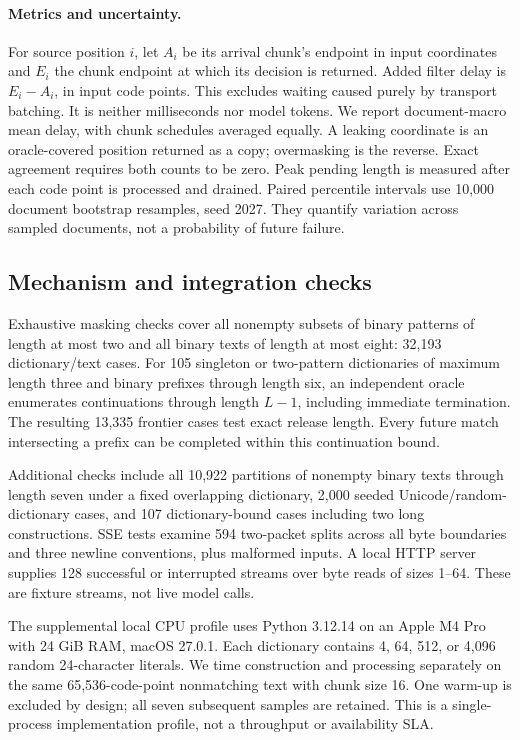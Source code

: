 \documentclass[11pt,a4paper]{article}
\begin{document}
\paragraph{Metrics and uncertainty.}
For source position $i$, let $A_i$ be its arrival chunk's endpoint in input coordinates and $E_i$ the chunk endpoint at which its decision is returned. Added filter delay is $E_i-A_i$, in input code points. This excludes waiting caused purely by transport batching. It is neither milliseconds nor model tokens. We report document-macro mean delay, with chunk schedules averaged equally. A leaking coordinate is an oracle-covered position returned as a copy; overmasking is the reverse. Exact agreement requires both counts to be zero. Peak pending length is measured after each code point is processed and drained. Paired percentile intervals use 10,000 document bootstrap resamples, seed 2027. They quantify variation across sampled documents, not a probability of future failure.

\subsection{Mechanism and integration checks}
Exhaustive masking checks cover all nonempty subsets of binary patterns of length at most two and all binary texts of length at most eight: 32,193 dictionary/text cases. For 105 singleton or two-pattern dictionaries of maximum length three and binary prefixes through length six, an independent oracle enumerates continuations through length $L-1$, including immediate termination. The resulting 13,335 frontier cases test exact release length. Every future match intersecting a prefix can be completed within this continuation bound.

Additional checks include all 10,922 partitions of nonempty binary texts through length seven under a fixed overlapping dictionary, 2,000 seeded Unicode/random-dictionary cases, and 107 dictionary-bound cases including two long constructions. SSE tests examine 594 two-packet splits across all byte boundaries and three newline conventions, plus malformed inputs. A local HTTP server supplies 128 successful or interrupted streams over byte reads of sizes 1--64. These are fixture streams, not live model calls.

The supplemental local CPU profile uses Python 3.12.14 on an Apple M4 Pro with 24 GiB RAM, macOS 27.0.1. Each dictionary contains 4, 64, 512, or 4,096 random 24-character literals. We time construction and processing separately on the same 65,536-code-point nonmatching text with chunk size 16. One warm-up is excluded by design; all seven subsequent samples are retained. This is a single-process implementation profile, not a throughput or availability SLA.
\end{document}
